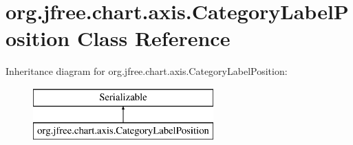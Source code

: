 \hypertarget{classorg_1_1jfree_1_1chart_1_1axis_1_1_category_label_position}{}\section{org.\+jfree.\+chart.\+axis.\+Category\+Label\+Position Class Reference}
\label{classorg_1_1jfree_1_1chart_1_1axis_1_1_category_label_position}
Inheritance diagram for org.\+jfree.\+chart.\+axis.\+Category\+Label\+Position\+:\begin{figure}[H]
\begin{center}
\leavevmode
\includegraphics[height=2.000000cm]{classorg_1_1jfree_1_1chart_1_1axis_1_1_category_label_position}
\end{center}
\end{figure}

